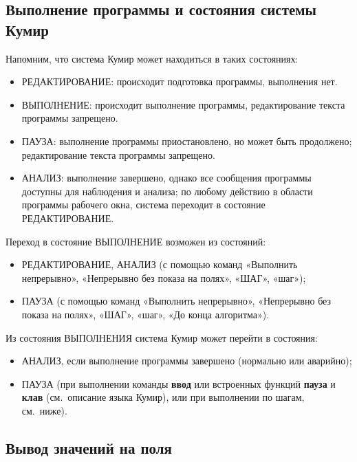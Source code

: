 \subsection{Выполнение программы и состояния системы Кумир}

Напомним, что система Кумир может находиться в таких состояниях:
\begin{itemize}
\item РЕДАКТИРОВАНИЕ: происходит подготовка программы, выполнения нет.
\item ВЫПОЛНЕНИЕ:  происходит выполнение программы, редактирование текста программы запрещено.
\item ПАУЗА: выполнение программы приостановлено, но может быть продолжено; редактирование текста программы запрещено.
\item АНАЛИЗ: выполнение завершено, однако все сообщения программы доступны для наблюдения и анализа; по любому действию в области программы рабочего окна, система переходит в состояние РЕДАКТИРОВАНИЕ.
\end{itemize}

Переход в состояние ВЫПОЛНЕНИЕ возможен из состояний:
\begin{itemize}
\item РЕДАКТИРОВАНИЕ, АНАЛИЗ (с помощью команд «Выполнить непрерывно», «Неп\-ре\-рыв\-но без показа на полях», «ШАГ», «шаг»);
\item ПАУЗА (с помощью команд «Выполнить непрерывно», «Непрерывно без показа на полях», «ШАГ», «шаг», «До конца алгоритма»).
\end{itemize}

Из состояния ВЫПОЛНЕНИЯ система Кумир может перейти в состояния: 
\begin{itemize}
\item АНАЛИЗ, если выполнение программы завершено (нормально или аварийно);
\item ПАУЗА (при выполнении команды \textsf{\textbf{ввод}} или встроенных функций \textsf{\textbf{пауза}} и \textsf{\textbf{клав}} (см.~описание языка Кумир), или при выполнении по шагам, см.~ниже).
\end{itemize}

\subsection{Вывод значений на поля}
\label{diagnost}

